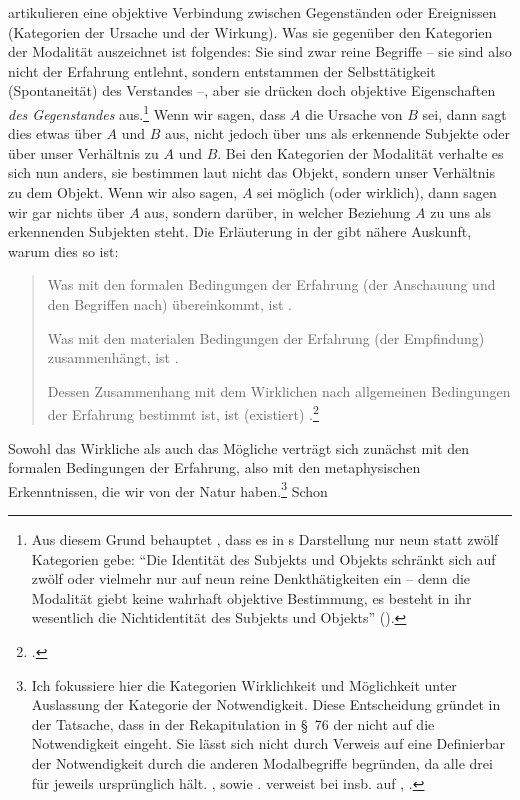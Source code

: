 artikulieren eine objektive Verbindung zwischen Gegenständen oder Ereignissen
(Kategorien der Ursache und der Wirkung). Was sie gegenüber den Kategorien der
Modalität auszeichnet ist folgendes: Sie sind zwar reine Begriffe -- sie sind also
nicht der Erfahrung entlehnt, sondern entstammen der Selbsttätigkeit
(Spontaneität) des Verstandes --, aber sie drücken doch objektive Eigenschaften \emph{des
Gegenstandes} aus.\footnote{Aus diesem Grund behauptet
, dass es in s
Darstellung nur neun statt zwölf Kategorien gebe:
\enquote{Die Identität des Subjekts und Objekts schränkt sich auf zwölf oder
vielmehr nur auf neun reine Denkthätigkeiten ein -- denn die Modalität giebt
keine wahrhaft objektive Bestimmung, es besteht in ihr wesentlich die
Nichtidentität des Subjekts und Objekts} \mkbibparens{\cite[][IV: 6.
8--11]{Hegel:GesammelteWerke}}.} Wenn wir sagen, dass $A$ die Ursache von $B$
sei, dann sagt dies etwas über $A$ und $B$ aus, nicht jedoch über uns
als erkennende Subjekte oder über unser Verhältnis zu $A$ und $B$. Bei den Kategorien der Modalität
verhalte es sich nun anders, sie bestimmen laut  nicht das
Objekt, sondern unser Verhältnis zu dem Objekt. Wenn wir also sagen, $A$ sei
möglich (oder wirklich), dann sagen wir gar nichts über $A$ aus, sondern
darüber, in welcher Beziehung $A$ zu uns als erkennenden Subjekten steht. Die
Erläuterung in der  gibt nähere Auskunft, warum
dies so ist:
\begin{quote}
\begin{nummerierung}
\item Was mit den formalen Bedingungen der Erfahrung (der Anschauung und den
Begriffen nach) übereinkommt, ist .
\item Was mit den materialen Bedingungen der Erfahrung (der Empfindung)
zusammenhängt, ist .
\item Dessen Zusammenhang mit dem Wirklichen nach allgemeinen Bedingungen der
Erfahrung bestimmt ist, ist (existiert)
.\footnote{\cite[][B 265\,f.,]{Kant:KritikderreinenVernunft2003}
\cite[][III: 185.22--186.2]{Kant:GesammelteWerke1900ff.}.}
\end{nummerierung}
\end{quote}
Sowohl das Wirkliche als auch das Mögliche verträgt sich zunächst mit den formalen Bedingungen der
Erfahrung, also mit den metaphysischen Erkenntnissen, die wir von der Natur
haben.\footnote{Ich fokussiere hier die Kategorien Wirklichkeit und Möglichkeit unter
Auslassung der Kategorie der Notwendigkeit. Diese Entscheidung
gründet in der Tatsache, dass  in der Rekapitulation in
\S~76 der  nicht auf die Notwendigkeit eingeht.
Sie lässt sich nicht durch Verweis auf eine Definierbar der Notwendigkeit durch
die anderen Modalbegriffe begründen, da  alle drei für
jeweils ursprünglich hält. \cite[Vgl.][196]{Poser:DieStufenderModalitaet1981},
sowie
\cite[][42--45]{Kamlah:KantsAntwortaufHumeundeinelinguistischeAnalyseseinerModalbegriffe2009}.
 verweist bei
 insb. auf \cite[][B 111]{Kant:KritikderreinenVernunft2003},
\cite[][III: 96.8--17]{Kant:GesammelteWerke1900ff.}.} Schon
